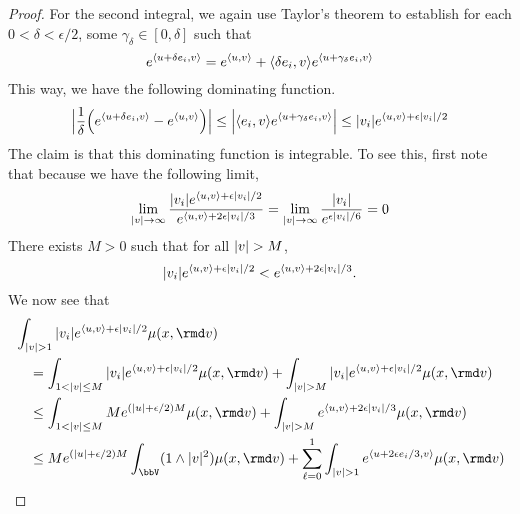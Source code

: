 \begin{proof}
  For the second integral, we again use Taylor's theorem to establish for each $0 < \delta < \epsilon/2$, some $\gamma_\delta \in [0,\delta]$ such that
  \begin{equation*}
    e^{\langle u+\delta e_i , v \rangle} = e^{\langle u , v \rangle} + {\langle \delta e_i , v \rangle} e^{\langle u+\gamma_\delta e_i , v \rangle}
  \end{equation*}
  This way, we have the following dominating function.
  \begin{equation*}
    \Big| \frac1\delta \Big( e^{\langle u+\delta e_i , v \rangle} - e^{\langle u , v \rangle} \Big) \Big| 
    \leq \Big|{\langle e_i , v \rangle} e^{\langle u+\gamma_\delta e_i , v \rangle} \Big|
    \leq |v_i| e^{{\langle u , v \rangle} + \epsilon|v_i|/2}
  \end{equation*}
  The claim is that this dominating function is integrable.
  To see this, first note that because we have the following limit,
  \begin{equation*}
    \lim_{|v|\rightarrow\infty} \frac{|v_i|e^{{\langle u , v \rangle}+\epsilon|v_i|/2}}{e^{{\langle u , v \rangle}+2\epsilon|v_i|/3}} = \lim_{|v|\rightarrow\infty} \frac{|v_i|}{e^{\epsilon|v_i|/6}} =  0
  \end{equation*}
  There exists $M > 0$ such that for all $|v| > M$, 
  \begin{equation*}
    |v_i| e^{{\langle u , v \rangle} + \epsilon|v_i|/2} < e^{{\langle u , v \rangle} + 2\epsilon|v_i|/3}.
  \end{equation*}
  We now see that
  \begin{align*}
    &\int_{|\markVar| > 1} |\markVar_i| e^{\prj{\momentVar}{\markVar} + \epsilon|\markVar_i|/2} \affJump(\stateVar,\rmd\markVar) \\
    &\quad=\int_{1 < |\markVar|\leq M} |\markVar_i| e^{\prj{\momentVar}{\markVar} + \epsilon|\markVar_i|/2} \affJump(\stateVar,\rmd\markVar) +  \int_{|\markVar| > M} |\markVar_i| e^{\prj{\momentVar}{\markVar} + \epsilon|\markVar_i|/2} \affJump(\stateVar,\rmd\markVar) \\
    &\quad\leq \int_{1 < |\markVar| \leq M} M e^{(|\momentVar|+\epsilon/2)M} \affJump(\stateVar,\rmd\markVar) + \int_{|\markVar| > M} e^{\prj{\momentVar}{\markVar} + 2\epsilon|\markVar_i|/3} \affJump(\stateVar,\rmd\markVar) \\
    &\quad\leq Me^{(|\momentVar|+\epsilon/2)M} \int_\vecSpace (1 \wedge |\markVar|^2) \affJump(\stateVar,\rmd\markVar) + \sum_{\ell=0}^1 \int_{|\markVar|>1} e^\prj{\momentVar+2\epsilon \basisVec_i/3}{\markVar} \affJump(\stateVar,\rmd\markVar) \\

\end{align*}
\end{proof}
